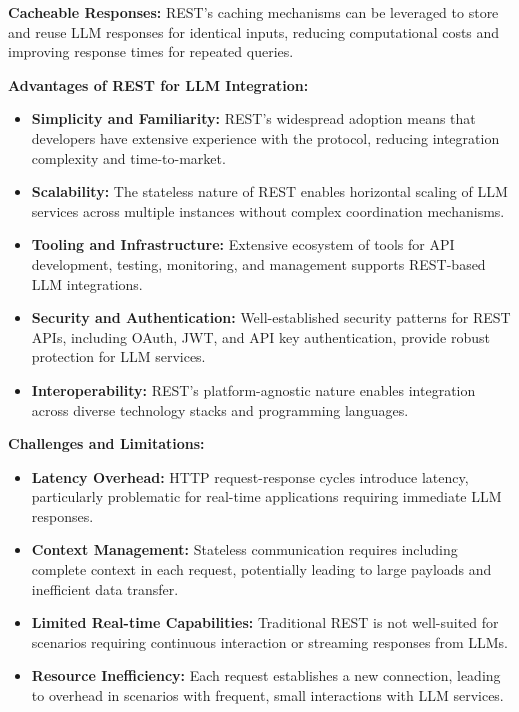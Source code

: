 \textbf{Cacheable Responses:} REST's caching mechanisms can be leveraged to store and reuse LLM responses for identical inputs, reducing computational costs and improving response times for repeated queries.

\textbf{Advantages of REST for LLM Integration:}

\begin{itemize}
    \item \textbf{Simplicity and Familiarity:} REST's widespread adoption means that developers have extensive experience with the protocol, reducing integration complexity and time-to-market.
    \item \textbf{Scalability:} The stateless nature of REST enables horizontal scaling of LLM services across multiple instances without complex coordination mechanisms.
    \item \textbf{Tooling and Infrastructure:} Extensive ecosystem of tools for API development, testing, monitoring, and management supports REST-based LLM integrations.
    \item \textbf{Security and Authentication:} Well-established security patterns for REST APIs, including OAuth, JWT, and API key authentication, provide robust protection for LLM services.
    \item \textbf{Interoperability:} REST's platform-agnostic nature enables integration across diverse technology stacks and programming languages.
\end{itemize}

\textbf{Challenges and Limitations:}

\begin{itemize}
    \item \textbf{Latency Overhead:} HTTP request-response cycles introduce latency, particularly problematic for real-time applications requiring immediate LLM responses.
    \item \textbf{Context Management:} Stateless communication requires including complete context in each request, potentially leading to large payloads and inefficient data transfer.
    \item \textbf{Limited Real-time Capabilities:} Traditional REST is not well-suited for scenarios requiring continuous interaction or streaming responses from LLMs.
    \item \textbf{Resource Inefficiency:} Each request establishes a new connection, leading to overhead in scenarios with frequent, small interactions with LLM services.
\end{itemize}

